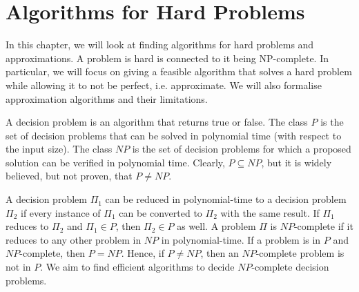\documentclass[a4paper, openany]{memoir}
\begin{document}
    \chapter{Algorithms for Hard Problems}
    In this chapter, we will look at finding algorithms for hard problems and approximations. A problem is hard is connected to it being NP-complete. In particular, we will focus on giving a feasible algorithm that solves a hard problem while allowing it to not be perfect, i.e. approximate. We will also formalise approximation algorithms and their limitations.

    A decision problem is an algorithm that returns true or false. The class $P$ is the set of decision problems that can be solved in polynomial time (with respect to the input size). The class $NP$ is the set of decision problems for which a proposed solution can be verified in polynomial time. Clearly, $P \subseteq NP$, but it is widely believed, but not proven, that $P \neq NP$.

    A decision problem $\Pi_1$ can be reduced in polynomial-time to a decision problem $\Pi_2$ if every instance of $\Pi_1$ can be converted to $\Pi_2$ with the same result. If $\Pi_1$ reduces to $\Pi_2$ and $\Pi_1 \in P$, then $\Pi_2 \in P$ as well. A problem $\Pi$ is $NP$-complete if it reduces to any other problem in $NP$ in polynomial-time. If a problem is in $P$ and $NP$-complete, then $P = NP$. Hence, if $P \neq NP$, then an $NP$-complete problem is not in $P$. We aim to find efficient algorithms to decide $NP$-complete decision problems.
\end{document}
